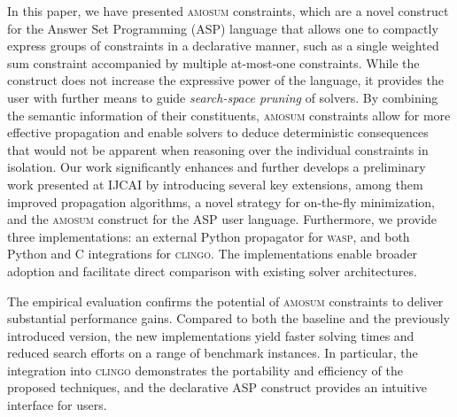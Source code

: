 \documentclass[preprint,authoryear]{elsarticle}
\theoremstyle{definition}
\begin{document}

In this paper, we have presented \textsc{amosum} constraints, which are a novel construct for the Answer Set Programming (ASP) language that allows one to compactly express groups of constraints in a declarative manner, such as a single weighted sum constraint accompanied by multiple at-most-one constraints. While the construct does not increase the expressive power of the language, it provides the user with further means to guide \emph{search-space pruning} of
solvers. By combining the semantic information of their constituents, \textsc{amosum} constraints allow for more effective propagation and enable solvers to deduce deterministic consequences that would not be apparent when reasoning over the individual constraints in isolation.
Our work significantly enhances and further develops a preliminary work presented at IJCAI \citep{DBLP:conf/ijcai/AlvianoDFM24} by introducing several key extensions, among them improved propagation algorithms, a novel  strategy for on-the-fly minimization, and the \textsc{amosum} construct for the ASP user language. Furthermore, we provide three implementations: an external Python propagator for \textsc{wasp}, and both Python and C integrations for \textsc{clingo}.
The implementations enable broader adoption and facilitate direct comparison with existing solver architectures.

The empirical evaluation confirms the potential of \textsc{amosum} constraints to deliver substantial performance gains.
Compared to both the baseline and the previously introduced version, the new implementations yield faster solving times and reduced search efforts on a range of benchmark instances.
In particular, the integration into \textsc{clingo} demonstrates the portability and efficiency of the proposed techniques, and the declarative ASP construct provides an intuitive interface for users.
\smallskip
\end{document}
